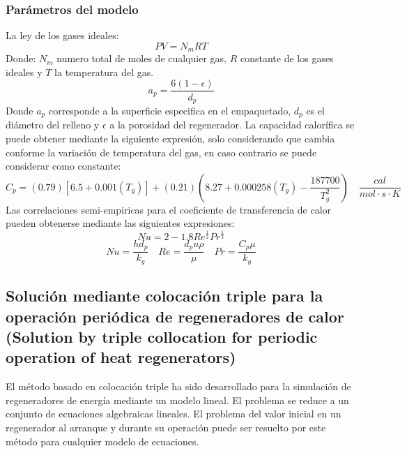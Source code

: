 \documentclass[12pt,letterpaper,final]{article}%
\begin{document}
\subsubsection*{Parámetros del modelo}
La ley de los gases ideales:
\begin{equation}
	PV=N_m R T
\end{equation}
Donde: $N_m$ numero total de moles de cualquier gas, $R$ constante de los gases ideales y $T$ la temperatura del gas.
\begin{equation}
	a_p=\frac{6(1-\epsilon)}{d_p}
\end{equation}
Donde $a_p$ corresponde a la superficie especifica en el empaquetado, $d_p$ es el diámetro del relleno y $\epsilon$ a la porosidad del regenerador. 
\newline
La capacidad calorífica se puede obtener mediante la siguiente expresión, solo considerando que cambia conforme la variación de temperatura del gas\cite{green2018perry}, en caso contrario se puede considerar como constante:
\begin{equation}
	C_p=(0.79)[6.5+0.001(T_g)] + (0.21)(8.27+0.000258(T_g)-\frac{187700}{T_g^2}) \quad \frac{cal}{mol\cdot s \cdot K}
	\end{equation}
Las correlaciones semi-empiricas para el coeficiente de transferencia de calor pueden obtenerse mediante las siguientes expresiones\cite{Levenspiel1983}:
\begin{equation}
	Nu = 2 - 1.8 Re^{\frac{1}{2}}Pr^{\frac{1}{3}}
\end{equation}
\begin{equation*}
	Nu = \frac{hd_p}{k_g} \quad Re = \frac{d_p u\rho}{\mu} \quad Pr=\frac{C_p \mu }{k_g}
\end{equation*}

\subsection*{Solución mediante colocación triple para la operación periódica de regeneradores de calor (Solution by triple collocation for periodic operation of heat regenerators)}

El método basado en colocación triple ha sido desarrollado para la simulación de regeneradores de energía mediante un modelo lineal. El problema se reduce a un conjunto de ecuaciones algebraicas lineales. El problema del valor inicial en un regenerador al arranque y durante su operación puede ser resuelto por este método para cualquier modelo de ecuaciones.
\end{document}
